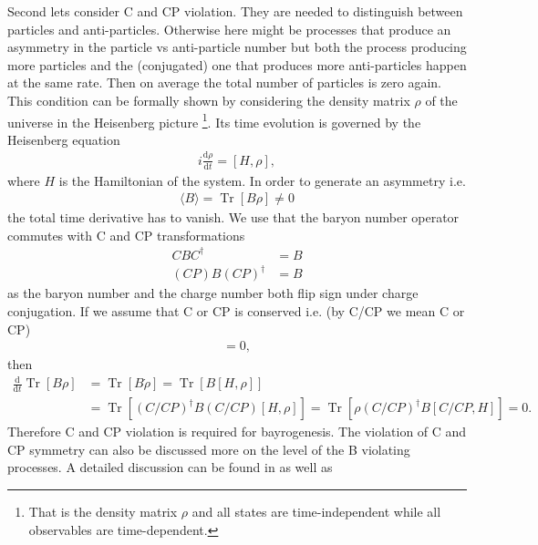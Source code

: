 \documentclass[13pt,a4paper,titlepage]{article}
\newcommand{\Tr}{\operatorname{Tr}}
\begin{document}
Second lets consider C and CP violation. They are needed to distinguish between particles and anti-particles. Otherwise here might be processes that produce an asymmetry in the
particle vs anti-particle number but both the process producing more particles and the (conjugated) one that produces more anti-particles happen at the same rate.
Then on average the total number of particles is zero again.
This condition can be formally shown by considering the density matrix $\rho$ of the universe in the Heisenberg picture \footnote{That is the density matrix $\rho$ and all states are time-independent while all observables are time-dependent.}. Its time evolution is governed by the Heisenberg equation
\begin{align}
    i \frac{\mathrm{d} \rho}{\mathrm{d} t} = [H, \rho],
\end{align}
where $H$ is the Hamiltonian of the system.
In order to generate an asymmetry i.e.
\begin{align}
    \langle B \rangle = \Tr [ B \rho ] \neq 0
\end{align}
the total time derivative has to vanish.
We use that the baryon number operator commutes with C and CP transformations
\begin{align}
    C B C^\dagger &= B \\
    (C P) B (C P)^\dagger &= B
\end{align}
as the baryon number and the charge number both flip sign under charge conjugation.
If we assume that C or CP is conserved i.e. (by C/CP we mean C or CP)
\begin{align}
[H, C/CP] = 0,
\end{align}
then
\begin{align}
    \frac{\mathrm{d}}{\mathrm{d} t} \Tr [ B \rho ] &= \Tr [ B \dot{\rho} ] = \Tr [ B [H, \rho] ] \\
    &= \Tr [ (C/CP)^\dagger B (C/CP) [H, \rho] ] = \Tr [ \rho (C/CP)^\dagger B [C/CP, H] ] = 0.
\end{align}
Therefore C and CP violation is required for bayrogenesis. The violation of C and CP symmetry can also be discussed more on the level of the B violating processes. A detailed discussion can be found in \cite[sec 2.3]{Cline:2006ts_Baryogenesis} as well as %
\end{document}
